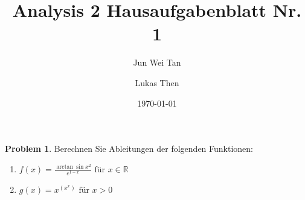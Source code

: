 \documentclass[prb,12pt]{revtex4-2}
\theoremstyle{definition}
\newtheorem{Problem}{Problem}
\theoremstyle{definition}
\newenvironment{parts}{\begin{enumerate}[label=(\alph*)]}{\end{enumerate}}
\newcommand{\R}{\mathbb{R}}
\begin{document}
	\title{Analysis 2 Hausaufgabenblatt Nr. 1}
	\author{Jun Wei Tan}
	\author{Lukas Then}
	\date{\today}
	\maketitle
\begin{Problem}
Berechnen Sie Ableitungen der folgenden Funktionen:
\begin{parts}
	\item $f(x)=\frac{\arctan\sin x^2}{e^{1-x}}\text{ f\"{u}r }x\in \R$ 
	\item $g(x)=x^{(x^x)}\text{ f\"{u}r }x>0$
\end{parts}
\end{Problem}
\end{document}
